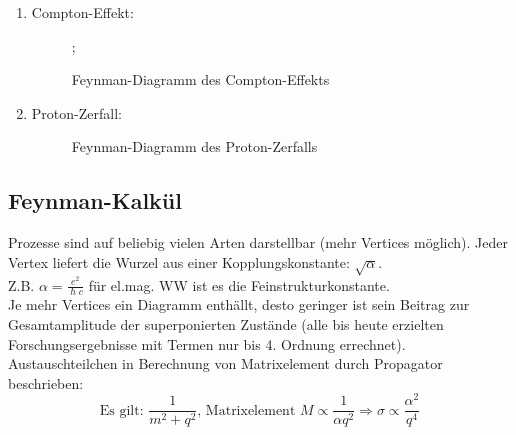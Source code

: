 \documentclass[Ex4_Zusammenfassung.tex]{subfiles}
\begin{document}
\begin{enumerate}
			\item Compton-Effekt:
				\begin{figure}[H]
					\centering
					;
					\caption{Feynman-Diagramm des Compton-Effekts}
				\end{figure}
			\item Proton-Zerfall:
				\begin{figure}[H]
					\centering
					\caption{Feynman-Diagramm des Proton-Zerfalls}
				\end{figure}
	\end{enumerate}
	
	\subsection*{Feynman-Kalkül}
	
	Prozesse sind auf beliebig vielen Arten darstellbar (mehr Vertices möglich). Jeder Vertex liefert die Wurzel aus einer Kopplungskonstante: $\sqrt{\alpha}$.\\
	Z.B. $\alpha = \frac{e^2}{\hslash c}$ für el.mag. WW ist es die Feinstrukturkonstante.\\
	Je mehr Vertices ein Diagramm enthällt, desto geringer ist sein Beitrag zur Gesamtamplitude der superponierten Zustände (alle bis heute erzielten Forschungsergebnisse mit Termen nur bis 4. Ordnung errechnet).\\
	Austauschteilchen in Berechnung von Matrixelement durch Propagator beschrieben:
	$$ \text{Es gilt: } \frac{1}{m^2 + q^2} \text{, Matrixelement } M \propto \frac{1}{\alpha q^2} \Rightarrow \sigma \propto \frac{\alpha^2}{q^4}$$
		
	
\end{document}
